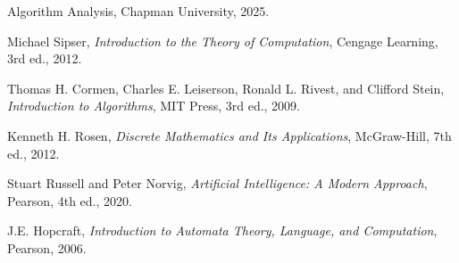 \documentclass[11pt]{article}
\begin{document}
\newpage
\begin{thebibliography}{9}

Algorithm Analysis, Chapman University, 2025.

Michael Sipser, \textit{Introduction to the Theory of Computation}, Cengage Learning, 3rd ed., 2012.

Thomas H. Cormen, Charles E. Leiserson, Ronald L. Rivest, and Clifford Stein, \textit{Introduction to Algorithms}, MIT Press, 3rd ed., 2009.

Kenneth H. Rosen, \textit{Discrete Mathematics and Its Applications}, McGraw-Hill, 7th ed., 2012.

Stuart Russell and Peter Norvig, \textit{Artificial Intelligence: A Modern Approach}, Pearson, 4th ed., 2020.

 J.E. Hopcraft, \textit{Introduction to Automata Theory, Language, and Computation}, Pearson, 2006. 

\end{thebibliography}
\end{document}
